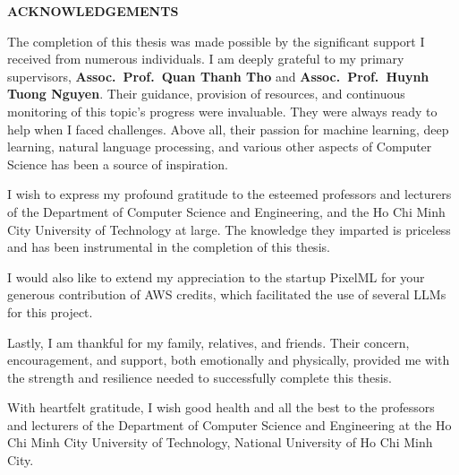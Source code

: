 \documentclass[a4paper,oneside]{book}
\begin{document}
\newpage
\begin{titlepage}
  \begin{center}
    \large\bf ACKNOWLEDGEMENTS
  \end{center}
  The completion of this thesis was made possible by the significant support I received from numerous individuals. I am deeply grateful to my primary supervisors, \textbf{Assoc.\ Prof.\ Quan Thanh Tho} and \textbf{Assoc.\ Prof.\ Huynh Tuong Nguyen}. Their guidance, provision of resources, and continuous monitoring of this topic's progress were invaluable. They were always ready to help when I faced challenges. Above all, their passion for machine learning, deep learning, natural language processing, and various other aspects of Computer Science has been a source of inspiration.

  I wish to express my profound gratitude to the esteemed professors and lecturers of the Department of Computer Science and Engineering, and the Ho Chi Minh City University of Technology at large. The knowledge they imparted is priceless and has been instrumental in the completion of this thesis.

  I would also like to extend my appreciation to the startup PixelML for your generous contribution of AWS credits, which facilitated the use of several LLMs for this project.

  Lastly, I am thankful for my family, relatives, and friends. Their concern, encouragement, and support, both emotionally and physically, provided me with the strength and resilience needed to successfully complete this thesis.

  With heartfelt gratitude, I wish good health and all the best to the professors and lecturers of the Department of Computer Science and Engineering at the Ho Chi Minh City University of Technology, National University of Ho Chi Minh City.
\end{titlepage}
\end{document}
